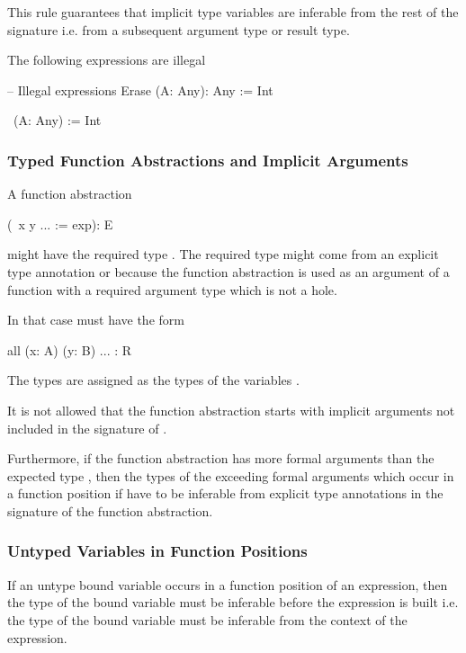This rule guarantees that implicit type variables are inferable from the rest of
the signature i.e. from a subsequent argument type or result type.


The following expressions are illegal
\begin{alba}
    -- Illegal expressions
    Erase (A: Any): Any :=
        Int

    \ (A: Any) := Int
\end{alba}




\subsubsection{Typed Function Abstractions and Implicit Arguments}

A function abstraction
\begin{alba}
    (\ x y ... := exp): E
\end{alba}
might have the required type . The required type might come from an
explicit type annotation or because the function abstraction is used as an
argument of a function with a required argument type which is not a hole.

In that case  must have the form
\begin{alba}
    all (x: A) (y: B) ... : R
\end{alba}
The types  are assigned as the types of the variables .

It is not allowed that the function abstraction starts with implicit arguments
not included in the signature of .

Furthermore, if the function abstraction has more formal arguments than the
expected type , then the types of the exceeding formal arguments which
occur in a function position if  have to be inferable from explicit
type annotations in the signature of the function abstraction.




\subsubsection{Untyped Variables in Function Positions}

If an untype bound variable occurs in a function position of an expression, then
the type of the bound variable must be inferable before the expression is built
i.e. the type of the bound variable must be inferable from the context of the
expression.

